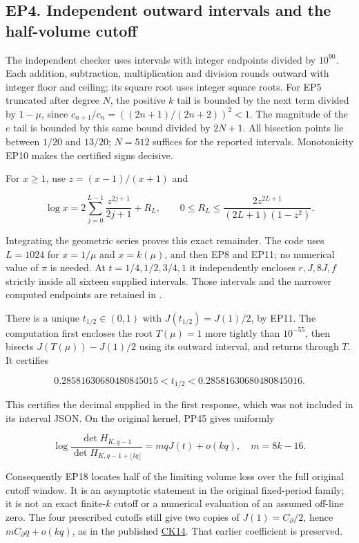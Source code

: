 \documentclass[10pt]{article}
\begin{document}
\subsection{EP4. Independent outward intervals and the half-volume cutoff}\label{ep4.-independent-outward-intervals-and-the-half-volume-cutoff}

The independent checker uses intervals with integer endpoints divided by \(10^{90}\). Each addition, subtraction, multiplication and division rounds outward with integer floor and ceiling; its square root uses integer square roots. For EP5 truncated after degree \(N\), the positive \(k\) tail is bounded by the next term divided by \(1-\mu\), since \(c_{n+1}/c_n=((2n+1)/(2n+2))^2<1\). The magnitude of the \(e\) tail is bounded by this same bound divided by \(2N+1\). All bisection points lie between \(1/20\) and \(13/20\); \(N=512\) suffices for the reported intervals. Monotonicity EP10 makes the certified signs decisive.

For \(x\ge1\), use \(z=(x-1)/(x+1)\) and

\[
 \log x=2\sum_{j=0}^{L-1}\frac{z^{2j+1}}{2j+1}+R_L,
 \qquad 0\le R_L\le\frac{2z^{2L+1}}{(2L+1)(1-z^2)}.
 \tag{EP17}
\]

Integrating the geometric series proves this exact remainder. The code uses \(L=1024\) for \(x=1/\mu\) and \(x=k(\mu)\), and then EP8 and EP11; no numerical value of \(\pi\) is needed. At \(t=1/4,1/2,3/4,1\) it independently encloses \(r,J,8J,f\) strictly inside all sixteen supplied intervals. Those intervals and the narrower computed endpoints are retained in .

There is a unique \(t_{1/2}\in(0,1)\) with \(J(t_{1/2})=J(1)/2\), by EP11. The computation first encloses the root \(T(\mu)=1\) more tightly than \(10^{-55}\), then bisects \(J(T(\mu))-J(1)/2\) using its outward interval, and returns through \(T\). It certifies

\[
 \boxed{0.28581630680480845015<t_{1/2}<0.28581630680480845016.}
 \tag{EP18}
\]

This certifies the decimal supplied in the first response, which was not included in its interval JSON. On the original kernel, PP45 gives uniformly

\[
 \log\frac{\det H_{K,q-1}}{\det H_{K,q-1+\lfloor tq\rfloor}}
 =mqJ(t)+o(kq),\quad m=8k-16.
 \tag{EP19}
\]

Consequently EP18 locates half of the limiting volume loss over the full original cutoff window. It is an asymptotic statement in the original fixed-period family; it is not an exact finite-\(k\) cutoff or a numerical evaluation of an assumed off-line zero. The four prescribed cutoffs still give two copies of \(J(1)=C_\partial/2\), hence \(mC_\partial q+o(kq)\), as in the published \href{https://github.com/KokunoYumeto/zeta-function-research-reader/blob/1447462732b40b1474bd9a819cf79257f5326ada/workbenches/splitzero-tandem/continuations/20260922-kernel-frequency/COMBINED_KERNEL_AND_RECEIVERS.md\#L148}{CK14}. That earlier coefficient is preserved.
\end{document}

